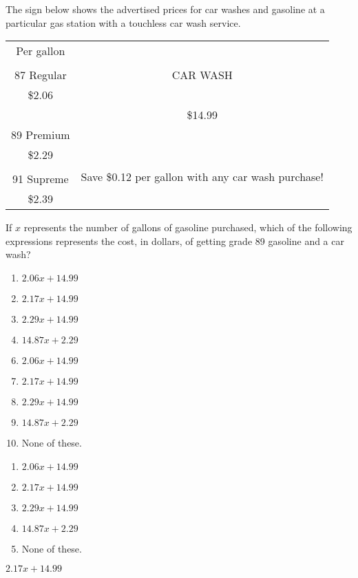  
The sign below shows the advertised prices for car washes and gasoline at a particular gas station with a touchless car wash service.
\begin{center}\begin{tabular}{||c||c||}\hline\hline
Per gallon &\\\cline{1-1}
&\\
87 Regular & {\large CAR WASH}\\
\$2.06&\\\cline{1-1}
 & {\large \$14.99}\\
89 Premium & \\\cline{2-2}
\$2.29 & \multirow{4}{2in}{\large Save \$0.12 per gallon with any car wash purchase!}\\\cline{1-1}
&\\
91 Supreme&\\
\$2.39&\\\hline \hline
\end{tabular}\end{center}
If $x$ represents the number of gallons of gasoline purchased, which of the following expressions represents the cost, in dollars, of getting grade 89 gasoline and a car wash?


\ifsat
	\begin{enumerate}[label=\Alph*)]
		\item $2.06x+14.99 $ 
		\item $2.17x+14.99 $ %
		\item $2.29x+14.99 $
		\item $14.87x+2.29 $
	\end{enumerate}
\else
\fi

\ifacteven
	\begin{enumerate}[label=\textbf{\Alph*.},itemsep=\fill,align=left]
		\setcounter{enumii}{5}
		\item $2.06x+14.99 $ 
		\item $2.17x+14.99 $ %
		\item $2.29x+14.99 $
		\addtocounter{enumii}{1}
		\item $14.87x+2.29 $
		\item None of these. 
	\end{enumerate}
\else
\fi

\ifactodd
	\begin{enumerate}[label=\textbf{\Alph*.},itemsep=\fill,align=left]
		\item $2.06x+14.99 $ 
		\item $2.17x+14.99 $ %
		\item $2.29x+14.99 $
		\item $14.87x+2.29 $
		\item None of these. 
	\end{enumerate}
\else
\fi

\ifgridin
 $2.17x+14.99 $ %
		
\else
\fi

